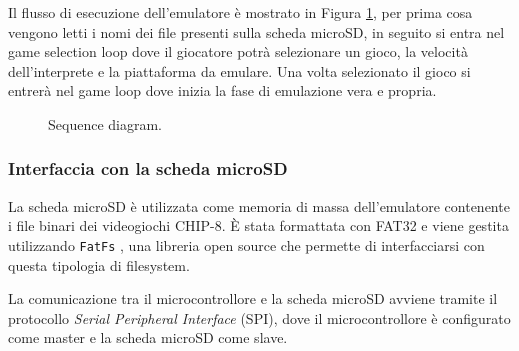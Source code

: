 \documentclass[a4paper]{article}
\begin{document}
Il flusso di esecuzione dell'emulatore è mostrato in Figura \ref{fig:sequence_diagram},
per prima cosa vengono letti i nomi dei file presenti sulla scheda microSD, in seguito
si entra nel game selection loop dove il giocatore potrà selezionare un gioco, la velocità
dell'interprete e la piattaforma da emulare. Una volta selezionato il gioco si entrerà nel
game loop dove inizia la fase di emulazione vera e propria.

\begin{figure}[h!t]
    \begin{center}
        
    \end{center}
    \caption{
        Sequence diagram.
    }
    \label{fig:sequence_diagram}
\end{figure}

\subsubsection{Interfaccia con la scheda microSD}\label{subsubsec:sd}

%
%

La scheda microSD è utilizzata come memoria di massa dell'emulatore contenente i file
binari dei videogiochi CHIP-8. È stata formattata con FAT32 e viene gestita utilizzando
\texttt{FatFs} \cite{elm-chan:fatfs}, una libreria open source che permette di
interfacciarsi con questa tipologia di filesystem.

La comunicazione tra il microcontrollore e la scheda microSD avviene tramite il protocollo
\textit{Serial Peripheral Interface} (SPI), dove il microcontrollore è configurato come
master e la scheda microSD come slave.

%

%
\end{document}

